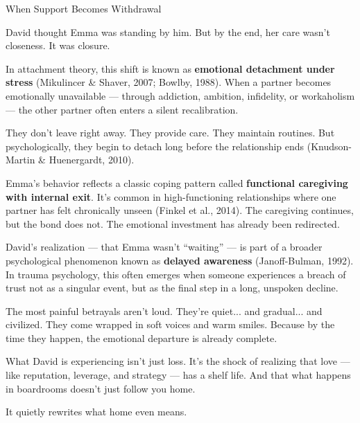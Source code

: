 \begin{PsychologicalSidebar}{When Support Becomes Withdrawal}

  David thought Emma was standing by him.  
  But by the end, her care wasn’t closeness. It was closure.

  \medskip

  In attachment theory, this shift is known as \textbf{emotional detachment under stress} 
  (Mikulincer \& Shaver, 2007; Bowlby, 1988).  
  When a partner becomes emotionally unavailable — through addiction, ambition, infidelity, or workaholism — 
  the other partner often enters a silent recalibration.

  \medskip

  They don’t leave right away.  
  They provide care. They maintain routines.  
  But psychologically, they begin to detach long before the relationship ends 
  (Knudson-Martin \& Huenergardt, 2010).

  \medskip

  Emma’s behavior reflects a classic coping pattern called \textbf{functional caregiving with internal exit}.  
  It’s common in high-functioning relationships where one partner has felt chronically unseen 
  (Finkel et al., 2014).  
  The caregiving continues, but the bond does not.  
  The emotional investment has already been redirected.

  \medskip

  David’s realization --- that Emma wasn’t ``waiting'' --- is part of a broader psychological phenomenon known as 
  \textbf{delayed awareness} (Janoff-Bulman, 1992).  
  In trauma psychology, this often emerges when someone experiences a breach of trust not as a singular event, 
  but as the final step in a long, unspoken decline.

  \medskip

  The most painful betrayals aren’t loud.  
  They’re quiet... and gradual... and civilized.  
  They come wrapped in soft voices and warm smiles.  
  Because by the time they happen, the emotional departure is already complete.

  \medskip

  What David is experiencing isn’t just loss.  
  It’s the shock of realizing that love --- like reputation, leverage, and strategy --- has a shelf life.  
  And that what happens in boardrooms doesn’t just follow you home.  

  \medskip

  It quietly rewrites what home even means.

\end{PsychologicalSidebar}


